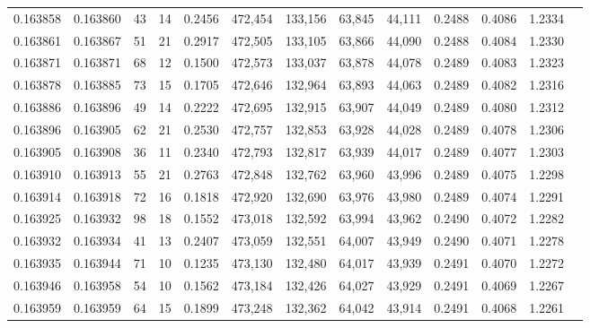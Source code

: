 \begin{tabular}{rrrrrrrrrrrrr}
0.163858 & 0.163860 &    43 &  14 &                                     0.2456 & 472,454 & 133,156 &  63,845 &  44,111 & 0.2488 & 0.4086 & 1.2334 \\
0.163861 & 0.163867 &    51 &  21 &                                     0.2917 & 472,505 & 133,105 &  63,866 &  44,090 & 0.2488 & 0.4084 & 1.2330 \\
0.163871 & 0.163871 &    68 &  12 &                                     0.1500 & 472,573 & 133,037 &  63,878 &  44,078 & 0.2489 & 0.4083 & 1.2323 \\
0.163878 & 0.163885 &    73 &  15 &                                     0.1705 & 472,646 & 132,964 &  63,893 &  44,063 & 0.2489 & 0.4082 & 1.2316 \\
0.163886 & 0.163896 &    49 &  14 &                                     0.2222 & 472,695 & 132,915 &  63,907 &  44,049 & 0.2489 & 0.4080 & 1.2312 \\
0.163896 & 0.163905 &    62 &  21 &                                     0.2530 & 472,757 & 132,853 &  63,928 &  44,028 & 0.2489 & 0.4078 & 1.2306 \\
0.163905 & 0.163908 &    36 &  11 &                                     0.2340 & 472,793 & 132,817 &  63,939 &  44,017 & 0.2489 & 0.4077 & 1.2303 \\
0.163910 & 0.163913 &    55 &  21 &                                     0.2763 & 472,848 & 132,762 &  63,960 &  43,996 & 0.2489 & 0.4075 & 1.2298 \\
0.163914 & 0.163918 &    72 &  16 &                                     0.1818 & 472,920 & 132,690 &  63,976 &  43,980 & 0.2489 & 0.4074 & 1.2291 \\
0.163925 & 0.163932 &    98 &  18 &                                     0.1552 & 473,018 & 132,592 &  63,994 &  43,962 & 0.2490 & 0.4072 & 1.2282 \\
0.163932 & 0.163934 &    41 &  13 &                                     0.2407 & 473,059 & 132,551 &  64,007 &  43,949 & 0.2490 & 0.4071 & 1.2278 \\
0.163935 & 0.163944 &    71 &  10 &                                     0.1235 & 473,130 & 132,480 &  64,017 &  43,939 & 0.2491 & 0.4070 & 1.2272 \\
0.163946 & 0.163958 &    54 &  10 &                                     0.1562 & 473,184 & 132,426 &  64,027 &  43,929 & 0.2491 & 0.4069 & 1.2267 \\
0.163959 & 0.163959 &    64 &  15 &                                     0.1899 & 473,248 & 132,362 &  64,042 &  43,914 & 0.2491 & 0.4068 & 1.2261 \\

\end{tabular}
